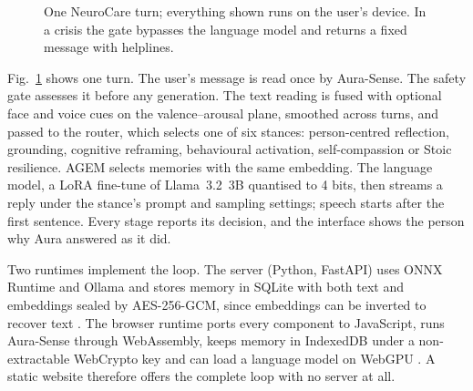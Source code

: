 \documentclass[conference]{IEEEtran}
\begin{document}
\begin{figure}[t]
\centering
{}
\caption{One NeuroCare turn; everything shown runs on the user's device. In a crisis the gate bypasses the language model and returns a fixed message with helplines.}
\label{fig:loop}
\end{figure}

Fig.~\ref{fig:loop} shows one turn. The user's message is read once by Aura-Sense. The safety gate assesses it before any generation. The text reading is fused with optional face and voice cues on the valence--arousal plane, smoothed across turns, and passed to the router, which selects one of six stances: person-centred reflection, grounding, cognitive reframing, behavioural activation, self-compassion or Stoic resilience. AGEM selects memories with the same embedding. The language model, a LoRA fine-tune of Llama~3.2~3B quantised to 4 bits, then streams a reply under the stance's prompt and sampling settings; speech starts after the first sentence. Every stage reports its decision, and the interface shows the person why Aura answered as it did.

Two runtimes implement the loop. The server (Python, FastAPI) uses ONNX Runtime and Ollama and stores memory in SQLite with both text and embeddings sealed by AES-256-GCM, since embeddings can be inverted to recover text \cite{morris2023}. The browser runtime ports every component to JavaScript, runs Aura-Sense through WebAssembly, keeps memory in IndexedDB under a non-extractable WebCrypto key and can load a language model on WebGPU \cite{ruan2024webllm}. A static website therefore offers the complete loop with no server at all.
\end{document}
